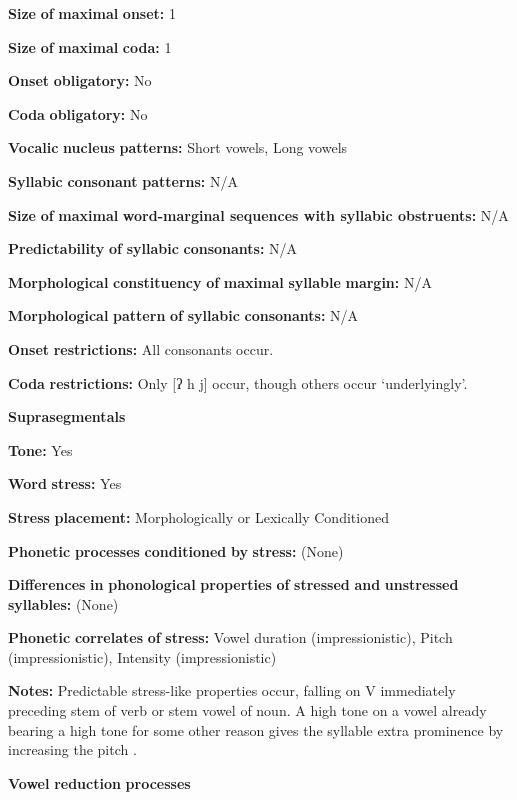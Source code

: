 \textbf{Size} \textbf{of} \textbf{maximal} \textbf{onset:} 1

\textbf{Size} \textbf{of} \textbf{maximal} \textbf{coda:} 1

\textbf{Onset} \textbf{obligatory:} No

\textbf{Coda} \textbf{obligatory:} No

\textbf{Vocalic} \textbf{nucleus} \textbf{patterns:} Short vowels, Long vowels

\textbf{Syllabic} \textbf{consonant} \textbf{patterns:} N/A

\textbf{Size} \textbf{of} \textbf{maximal} \textbf{word{}-marginal sequences with syllabic obstruents:} N/A

\textbf{Predictability} \textbf{of} \textbf{syllabic} \textbf{consonants:} N/A

\textbf{Morphological} \textbf{constituency} \textbf{of} \textbf{maximal} \textbf{syllable} \textbf{margin:} N/A

\textbf{Morphological} \textbf{pattern} \textbf{of} \textbf{syllabic} \textbf{consonants:} N/A

\textbf{Onset} \textbf{restrictions:} All consonants occur.

\textbf{Coda} \textbf{restrictions:} Only [ʔ h j] occur, though others occur ‘underlyingly’.

\textbf{Suprasegmentals}

\textbf{Tone:} Yes

\textbf{Word} \textbf{stress:} Yes

\textbf{Stress} \textbf{placement:} Morphologically or Lexically Conditioned

\textbf{Phonetic} \textbf{processes} \textbf{conditioned} \textbf{by} \textbf{stress:} (None)

\textbf{Differences} \textbf{in} \textbf{phonological} \textbf{properties} \textbf{of} \textbf{stressed} \textbf{and} \textbf{unstressed} \textbf{syllables:} (None)

\textbf{Phonetic} \textbf{correlates} \textbf{of} \textbf{stress:} Vowel duration (impressionistic), Pitch (impressionistic), Intensity (impressionistic)

\textbf{Notes:} Predictable stress-like properties occur, falling on V immediately preceding stem of verb or stem vowel of noun. A high tone on a vowel already bearing a high tone for some other reason gives the syllable extra prominence by increasing the pitch \citep[362]{Rice2005}.

\textbf{Vowel} \textbf{reduction} \textbf{processes}

